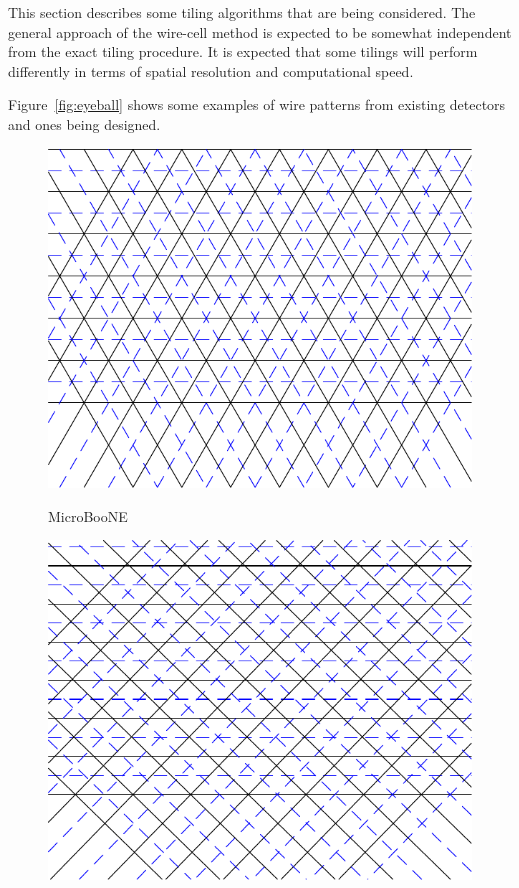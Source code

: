 \documentclass[letter]{article}
\begin{document}
This section describes some tiling algorithms that are being considered.
The general approach of the wire-cell method is expected to be
somewhat independent from the exact tiling procedure.
It is expected that some tilings will perform differently in terms of
spatial resolution and computational speed.

Figure~\ref{fig:eyeball} shows some examples of wire patterns from
existing detectors and ones being designed.

\begin{figure}[htbp]
  \centering

  \begin{minipage}[b]{0.3\linewidth}
    \begin{center}
        \includegraphics[width=\textwidth]{wires-uboone.pdf}              

        MicroBooNE
    \end{center}
  \end{minipage}
  \begin{minipage}[b]{0.3\linewidth}
    \begin{center}
        \includegraphics[width=\textwidth]{wires-35t.pdf}      


\end{center}
\end{minipage}
\end{figure}
\end{document}
